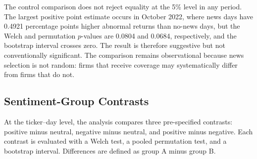 \documentclass[12pt,a4paper]{article}
\begin{document}
The control comparison does not reject equality at the 5\% level in any period. The largest positive point estimate occurs in October 2022, where news days have 0.4921 percentage points higher abnormal returns than no-news days, but the Welch and permutation $p$-values are 0.0804 and 0.0684, respectively, and the bootstrap interval crosses zero. The result is therefore suggestive but not conventionally significant. The comparison remains observational because news selection is not random: firms that receive coverage may systematically differ from firms that do not.

\subsection{Sentiment-Group Contrasts}
\label{subsec:sentiment-groups-multi-year}

At the ticker--day level, the analysis compares three pre-specified contrasts: positive minus neutral, negative minus neutral, and positive minus negative. Each contrast is evaluated with a Welch test, a pooled permutation test, and a bootstrap interval. Differences are defined as group A minus group B.
\end{document}
